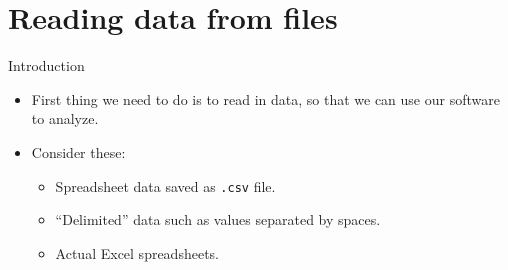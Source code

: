 \documentclass[unknownkeysallowed]{beamer}\usepackage[]{graphicx}\usepackage[]{color}
\begin{document}
%
%  
%
%  
%  
%
%  
%  
%  
%
%  
%
%      
%      
%  
%  






\section{Reading data from files}

\frame{\sectionpage}

\begin{frame}[fragile]{Introduction}
  
  \begin{itemize}
  \item First thing we need to do is to read in data, so that we can
    use our software to analyze.
  \item Consider these:
    \begin{itemize}
    \item Spreadsheet data saved as \texttt{.csv} file.
    \item ``Delimited'' data such as values separated by spaces.
    \item Actual Excel spreadsheets.
    \end{itemize}
  \end{itemize}
  
\end{frame}
\end{document}
